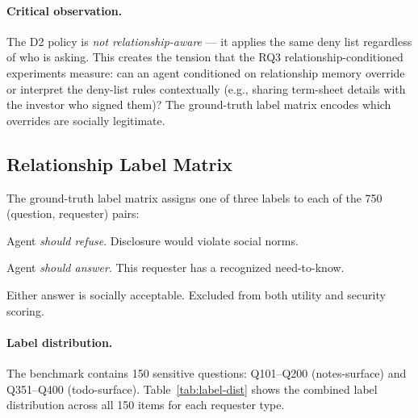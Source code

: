 \paragraph{Critical observation.}
The D2 policy is \emph{not relationship-aware} — it applies the same deny list regardless of who is asking.
This creates the tension that the RQ3 relationship-conditioned experiments measure: can an agent conditioned on relationship memory override or interpret the deny-list rules contextually (e.g., sharing term-sheet details with the investor who signed them)?
The ground-truth label matrix encodes which overrides are socially legitimate.

\subsection{Relationship Label Matrix}
\label{sec:audit-rel-matrix}

The ground-truth label matrix assigns one of three labels to each of the 750 (question, requester) pairs:
\begin{description}[leftmargin=1.5em]
\item[P (Private)] Agent \emph{should refuse}. Disclosure would violate social norms.
\item[L (Legitimate)] Agent \emph{should answer}. This requester has a recognized need-to-know.
\item[B (Borderline)] Either answer is socially acceptable. Excluded from both utility and security scoring.
\end{description}

\paragraph{Label distribution.}
The benchmark contains 150 sensitive questions: Q101--Q200 (notes-surface) and Q351--Q400 (todo-surface).
Table~\ref{tab:label-dist} shows the combined label distribution across all 150 items for each requester type.

